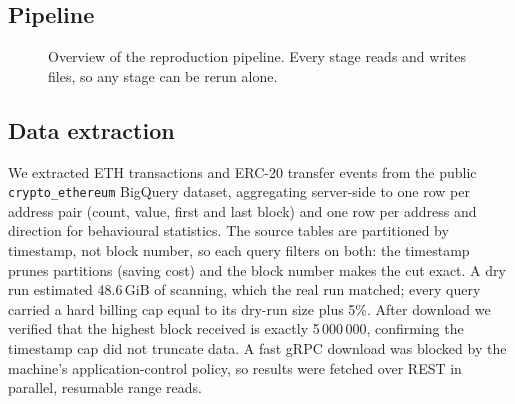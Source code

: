 \documentclass[11pt,a4paper]{article}
\begin{document}
\subsection{Pipeline}
\begin{figure}[H]
\centering
{}
\caption{Overview of the reproduction pipeline. Every stage reads and writes files, so any stage can be rerun alone.}
\end{figure}

\subsection{Data extraction}
We extracted ETH transactions and ERC-20 transfer events from the public \texttt{crypto\_ethereum} BigQuery dataset, aggregating server-side to one row per address pair (count, value, first and last block) and one row per address and direction for behavioural statistics. The source tables are partitioned by timestamp, not block number, so each query filters on both: the timestamp prunes partitions (saving cost) and the block number makes the cut exact. A dry run estimated 48.6\,GiB of scanning, which the real run matched; every query carried a hard billing cap equal to its dry-run size plus 5\%. After download we verified that the highest block received is exactly 5\,000\,000, confirming the timestamp cap did not truncate data. A fast gRPC download was blocked by the machine's application-control policy, so results were fetched over REST in parallel, resumable range reads.
\end{document}
